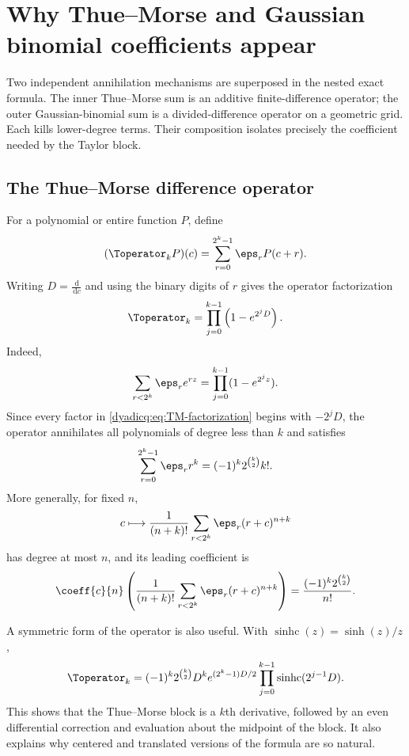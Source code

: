 \documentclass[11pt,oneside]{article}
\theoremstyle{definition}
\theoremstyle{remark}
\newcommand{\dd}{\,\mathrm d}
\begin{document}
\section{Why Thue--Morse and Gaussian binomial coefficients appear}

Two independent annihilation mechanisms are superposed in the nested exact
formula.  The inner Thue--Morse sum is an additive finite-difference operator;
the outer Gaussian-binomial sum is a divided-difference operator on a geometric
grid.  Each kills lower-degree terms.  Their composition isolates precisely
the coefficient needed by the Taylor block.

\subsection{The Thue--Morse difference operator}

For a polynomial or entire function $P$, define
\begin{equation}\label{dyadicq:eq:TM-operator}
  (\Toperator_kP)(c)
  =\sum_{r=0}^{2^k-1}\eps_rP(c+r).
\end{equation}
Writing $D=\frac{\dd}{\dd c}$ and using the binary digits of $r$ gives the
operator factorization
\begin{equation}\label{dyadicq:eq:TM-factorization}
  \Toperator_k
  =\prod_{j=0}^{k-1}\left(1-e^{2^jD}\right).
\end{equation}
Indeed,
\[
 \sum_{r<2^k}\eps_re^{rz}
 =\prod_{j=0}^{k-1}(1-e^{2^jz}).
\]
Since every factor in \eqref{dyadicq:eq:TM-factorization} begins with
$-2^jD$, the operator annihilates all polynomials of degree less than $k$ and
satisfies
\begin{equation}\label{dyadicq:eq:first-TM-moment}
  \sum_{r=0}^{2^k-1}\eps_rr^k
  =(-1)^k2^{\binom k2}k!.
\end{equation}
More generally, for fixed $n$,
\begin{equation}\label{dyadicq:eq:TM-degree-n}
  c\longmapsto
  \frac1{(n+k)!}
  \sum_{r<2^k}\eps_r(r+c)^{n+k}
\end{equation}
has degree at most $n$, and its leading coefficient is
\begin{equation}\label{dyadicq:eq:TM-leading-coeff}
  \coeff{c}{n}\left(
  \frac1{(n+k)!}\sum_{r<2^k}\eps_r(r+c)^{n+k}
  \right)
  =\frac{(-1)^k2^{\binom k2}}{n!}.
\end{equation}

A symmetric form of the operator is also useful.  With
$\operatorname{sinhc}(z)=\sinh(z)/z$,
\begin{equation}\label{dyadicq:eq:TM-sinhc}
 \Toperator_k
 =(-1)^k2^{\binom k2}D^k
 e^{(2^k-1)D/2}
 \prod_{j=0}^{k-1}
 \operatorname{sinhc}(2^{j-1}D).
\end{equation}
This shows that the Thue--Morse block is a $k$th derivative, followed by an
even differential correction and evaluation about the midpoint of the block.
It also explains why centered and translated versions of the formula are so
natural.
\end{document}
